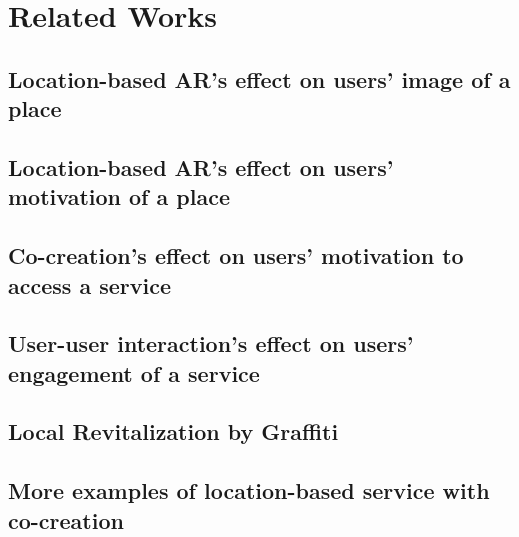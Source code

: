 \chapter{Related Works} \label{ch:3}

\section{Location-based AR's effect on users’ image of a place}

\section{Location-based AR's effect on users’ motivation of a place}

\section{Co-creation's effect on users’ motivation to access a service}

\section{User-user interaction's effect on users’ engagement of a service}

\section{Local Revitalization by Graffiti}

\section{More examples of location-based service with co-creation}
